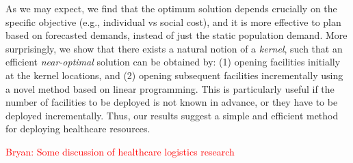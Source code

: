 As we may expect, we find that the optimum solution depends crucially on the specific objective
(e.g., individual vs social cost), and it is more effective to plan based on forecasted demands,
instead of just the static population demand. More surprisingly, we show that
there exists a natural notion of a \emph{kernel}, such that an efficient 
\emph{near-optimal} solution can be obtained by:
(1) opening facilities initially at the kernel locations, and
(2) opening subsequent facilities incrementally using a novel method based on linear programming.
This is particularly useful if the number of facilities to
be deployed is not known in advance, or they have to be deployed incrementally.
Thus, our results suggest a simple and efficient method for deploying healthcare resources.

\textcolor{red}{Bryan: Some discussion of healthcare logistics research}


